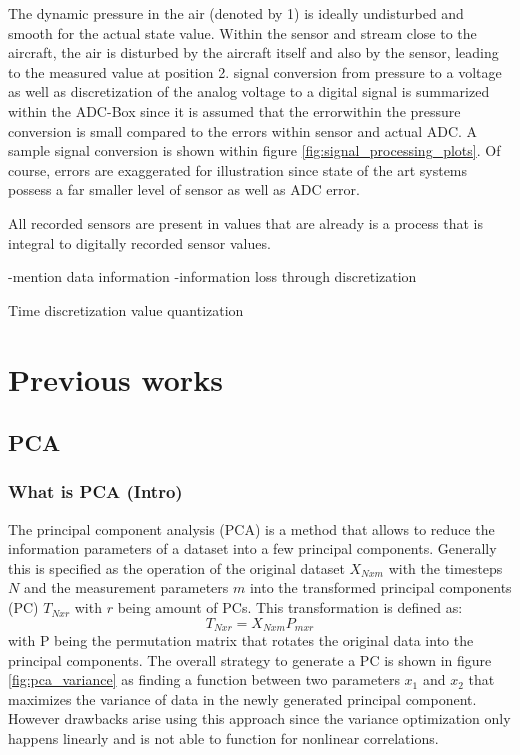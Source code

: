The dynamic pressure in the air (denoted by 1) is ideally undisturbed and smooth for the actual state value. Within the sensor and stream close to the aircraft, the air is disturbed by the aircraft itself and also by the sensor, leading to the measured value at position 2. signal conversion from pressure to a voltage as well as discretization of the analog voltage to a digital signal is summarized within the ADC-Box since it is assumed that the errorwithin the pressure conversion is small compared to the errors within sensor and actual ADC. A sample signal conversion is shown within figure \ref{fig:signal_processing_plots}. Of course, errors are exaggerated for illustration since state of the art systems possess a far smaller level of sensor as well as ADC error.


All recorded sensors are present in values that are already is a process that is integral to digitally recorded sensor values.



-mention data information
-information loss through discretization

Time discretization
value quantization


\section{Previous works}

\subsection{PCA}

\subsubsection{What is PCA (Intro)}


The principal component analysis (PCA) is a method that allows to reduce the information parameters of a dataset into a few principal components. Generally this is specified as the operation of the original dataset $X_{Nxm}$ with the timesteps $N$ and the measurement parameters $m$ into the transformed principal components (PC) $T_{Nxr}$ with $r$ being amount of PCs.
This transformation is defined as:
$$T_{Nxr} = X_{Nxm}  P_{mxr}$$
with P being the permutation matrix that rotates the original data into the principal components. The overall strategy to generate a PC is shown in figure \ref{fig:pca_variance} as finding a function between two parameters $x_1$ and $x_2$ that maximizes the variance of data in the newly generated principal component. However drawbacks arise using this approach since the variance optimization only happens linearly and is not able to function for nonlinear correlations.



